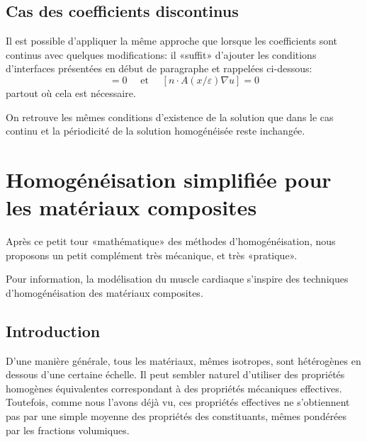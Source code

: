 \medskip
{}

\medskip
\subsection{Cas des coefficients discontinus}

Il est possible d'appliquer la même approche que lorsque les coefficients sont continus avec quelques modifications: il «suffit» d'ajouter les conditions d'interfaces présentées en début de paragraphe et rappelées ci-dessous:
\begin{equation} [u]=0 \quad \text{ et } \quad [n\cdot A(x/\varepsilon)\nabla u] = 0\end{equation}
partout où cela est nécessaire.

On retrouve les mêmes conditions d'existence de la solution que dans le cas continu et la périodicité de la solution homogénéisée reste inchangée.



\medskip
\section{Homogénéisation simplifiée pour les matériaux composites}

Après ce petit tour «mathématique» des méthodes d'homogénéisation, nous proposons un petit complément très mécanique, et très «pratique».

\medskip
Pour information, la modélisation du muscle cardiaque s'inspire des techniques d'homogénéisation des matériaux composites.


\medskip
\subsection{Introduction}

D'une manière générale, tous les matériaux, mêmes isotropes, sont hétérogènes en dessous d'une certaine échelle. Il peut sembler naturel d'utiliser des propriétés homogènes équivalentes correspondant à des propriétés mécaniques effectives. Toutefois, comme nous l'avons déjà vu, ces propriétés effectives ne s'obtiennent pas par une simple moyenne des propriétés des constituants, mêmes pondérées par les fractions volumiques.

